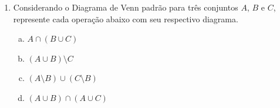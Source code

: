 \documentclass[12pt,a4paper]{article}
\begin{document}
\begin{enumerate}
  \item Considerando o Diagrama de Venn padrão para três conjuntos $A$, $B$ e
  $C$, represente cada operação abaixo com seu respectivo diagrama.

    \begin{enumerate}[(a)]
      \item $A\cap(B\cup C)$
      \item $(A\cup B)\setminus C$
      \item $(A\setminus B)\cup(C\setminus B)$
      \item $(A\cup B)\cap(A\cup C)$
    \end{enumerate}

\end{enumerate}
\end{document}
